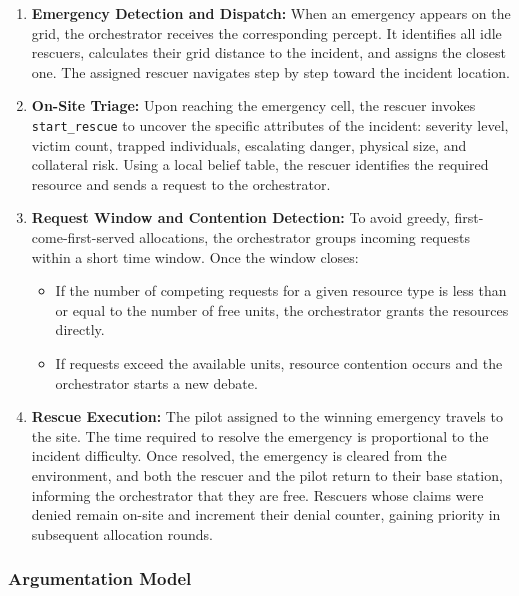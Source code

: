 \begin{enumerate}
    \item \textbf{Emergency Detection and Dispatch:} When an emergency appears on the grid, the orchestrator receives the corresponding percept. It identifies all idle rescuers, calculates their grid distance to the incident, and assigns the closest one. The assigned rescuer navigates step by step toward the incident location.
    
    \item \textbf{On-Site Triage:} Upon reaching the emergency cell, the rescuer invokes \texttt{start\_rescue} to uncover the specific attributes of the incident: severity level, victim count, trapped individuals, escalating danger, physical size, and collateral risk. Using a local belief table, the rescuer identifies the required resource and sends a request to the orchestrator.
    
    \item \textbf{Request Window and Contention Detection:} To avoid greedy, first-come-first-served allocations, the orchestrator groups incoming requests within a short time window. Once the window closes:
    \begin{itemize}
        \item If the number of competing requests for a given resource type is less than or equal to the number of free units, the orchestrator grants the resources directly.
        \item If requests exceed the available units, resource contention occurs and the orchestrator starts a new debate.
    \end{itemize}
    
    \item \textbf{Rescue Execution:} The pilot assigned to the winning emergency travels to the site. The time required to resolve the emergency is proportional to the incident difficulty. Once resolved, the emergency is cleared from the environment, and both the rescuer and the pilot return to their base station, informing the orchestrator that they are free. Rescuers whose claims were denied remain on-site and increment their denial counter, gaining priority in subsequent allocation rounds.
\end{enumerate}

\subsubsection{Argumentation Model}

